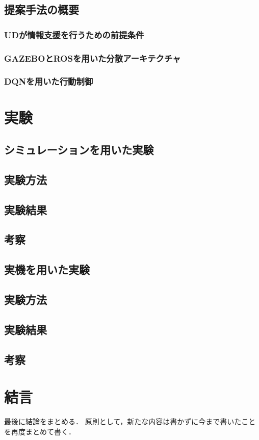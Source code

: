 \documentclass[12pt]{sonota/aislab}
\begin{document}
\section{提案手法の概要}
\subsection{UDが情報支援を行うための前提条件}
\subsection{GAZEBOとROSを用いた分散アーキテクチャ}
\subsection{DQNを用いた行動制御}

\chapter{実験}
\section{シミュレーションを用いた実験}
\section{実験方法}
\section{実験結果}
\section{考察}
\section{実機を用いた実験}
\section{実験方法}
\section{実験結果}
\section{考察}

\chapter{結言}
最後に結論をまとめる．
原則として，新たな内容は書かずに今まで書いたことを再度まとめて書く．
\end{document}
